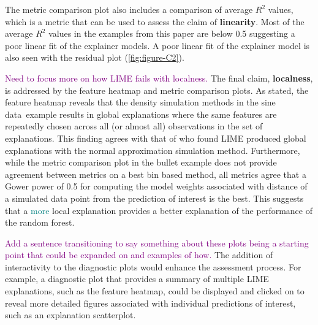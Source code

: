 \documentclass[AMS,STIX2COL]{WileyNJD-v2}\usepackage[]{graphicx}\usepackage[]{color}
\newcommand{\kgc}[1]{\textcolor{purple}{#1}}
\newcommand{\kge}[1]{\textcolor{teal}{#1}}
\newcommand{\data}{sine data}
\renewcommand{\sout}[1]{\unskip}
\begin{document}
The metric comparison plot also includes a comparison of average $R^2$ values, which is a metric that can be used to assess the claim of \textbf{linearity}. Most of the average $R^2$ values in the examples from this paper are below 0.5 suggesting a poor linear fit of the explainer models. A poor linear fit of the explainer model is also seen with the residual plot (\autoref{fig:figure-C2}).

\kgc{Need to focus more on how LIME fails with localness.} The final claim, \textbf{localness}, is addressed by the feature heatmap and metric comparison plots. As stated, the feature heatmap reveals that the density simulation methods in the \data \ example  results in global explanations where the same features are repeatedly chosen across all (or almost all) observations in the set of explanations. This finding agrees with that of \citet{laugel:2018} who found LIME produced global explanations with the normal approximation simulation method. \sout{For the bin based simulation methods in the bullet data example, the feature heatmap shows that the features chosen for the explanations vary between the two classification categories (match versus non-match). This is an interesting finding that suggests that different features can play a role in the predictions of observations in different response categories.} Furthermore, while the metric comparison plot in the bullet example does not provide agreement between metrics on a best bin based method, all metrics agree that a Gower power of 0.5 for computing the model weights associated with distance of a simulated data point from the prediction of interest is the best. This suggests that a \sout{less} \kge{more} local explanation provides a better explanation of the performance of the random forest.

\sout{Some of the visualizations in the paper generalize easily to any application of LIME such as the feature heatmap and metric plot. Other plots such as the visualizations of the LIME procedure would require extensions such as the use of scatterplot matrices to compare explanations with more than two features.} \kgc{Add a sentence transitioning to say something about these plots being a starting point that could be expanded on and examples of how.} The addition of interactivity to the diagnostic plots would \sout{provide additional} enhance\sout{ment of} the assessment process. For example, a diagnostic plot that provides a summary of multiple LIME explanations, such as the feature heatmap, could be displayed and clicked on to reveal more detailed figures associated with individual predictions of interest, such as an explanation scatterplot.
\end{document}
